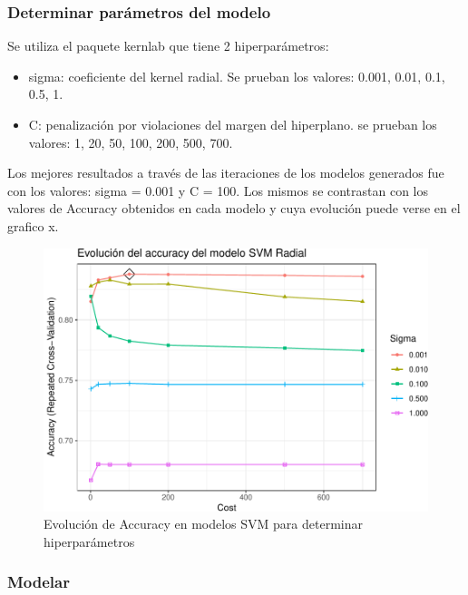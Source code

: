 \subsubsection{Determinar parámetros del modelo}
Se utiliza el paquete kernlab que tiene 2 hiperparámetros:

\begin{itemize}
	\item
	sigma: coeficiente del kernel radial. Se prueban los valores: 0.001,
	0.01, 0.1, 0.5, 1.
	\item
	C: penalización por violaciones del margen del hiperplano. se prueban
	los valores: 1, 20, 50, 100, 200, 500, 700.
\end{itemize}

Los mejores resultados a través de las iteraciones de los modelos
generados fue con los valores: sigma = 0.001 y C = 100. Los mismos se
contrastan con los valores de Accuracy obtenidos en cada modelo y cuya
evolución puede verse en el grafico x.



\begin{figure}[!htb]
	\centering
	\includegraphics{imagenes/modelos_varios/unnamed-chunk-32-1.pdf}
	\caption{Evolución de Accuracy en modelos SVM para determinar hiperparámetros}
	\label{fig:svm_hiperparam}
\end{figure}



\subsubsection{Modelar}


